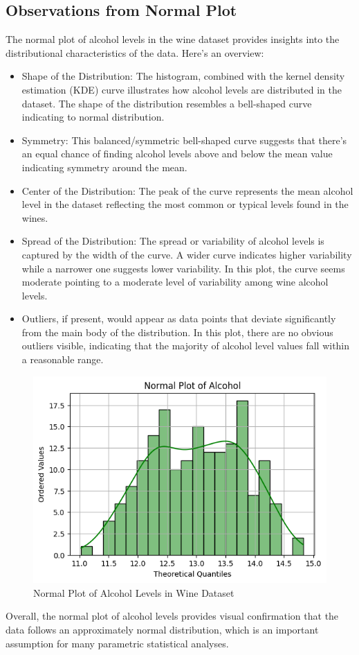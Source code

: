 \documentclass{article}
\begin{document}
\subsection {Observations from Normal Plot}
 The normal plot of alcohol levels in the wine dataset provides insights into the distributional characteristics of the data. Here's an overview:
\begin{itemize}
\item Shape of the Distribution: The histogram, combined with the kernel density estimation (KDE) curve illustrates how alcohol levels are distributed in the dataset. The shape of the distribution resembles a bell-shaped curve indicating to normal distribution.
\item Symmetry: This balanced/symmetric bell-shaped curve suggests that there's an equal chance of finding alcohol levels above and below the mean value indicating symmetry around the mean. 
\item Center of the Distribution: The peak of the curve represents the mean alcohol level in the dataset reflecting the most common or typical levels found in the wines. 
\item Spread of the Distribution: The spread or variability of alcohol levels is captured by the width of the curve. A wider curve indicates higher variability while a narrower one suggests lower variability. In this plot, the curve seems moderate pointing to a moderate level of variability among wine alcohol levels.
\item Outliers, if present, would appear as data points that deviate significantly from the main body of the distribution. In this plot, there are no obvious outliers visible, indicating that the majority of alcohol level values fall within a reasonable range.
\end{itemize}
\begin{figure}[ht]
    \centering
    \includegraphics[width=0.6\linewidth]{NormalPlot.png}
    \caption{Normal Plot of Alcohol Levels in Wine Dataset}
    \label{fig:NormalPlot}
\end{figure}
Overall, the normal plot of alcohol levels provides visual confirmation that the data follows an approximately normal distribution, which is an important assumption for many parametric statistical analyses.
\newpage
\end{document}
